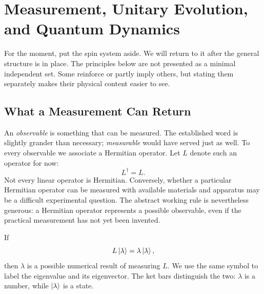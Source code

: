 \chapter{Measurement, Unitary Evolution, and Quantum Dynamics}


For the moment, put the spin system aside. We will return to it after the general structure is in place. The principles below are not presented as a minimal independent set. Some reinforce or partly imply others, but stating them separately makes their physical content easier to see.

\section{What a Measurement Can Return}

An \emph{observable} is something that can be measured. The established word is slightly grander than necessary; \emph{measurable} would have served just as well. To every observable we associate a Hermitian operator. Let \(L\) denote such an operator for now:
\begin{equation}
L^\dagger=L.
\end{equation}
Not every linear operator is Hermitian. Conversely, whether a particular Hermitian operator can be measured with available materials and apparatus may be a difficult experimental question. The abstract working rule is nevertheless generous: a Hermitian operator represents a possible observable, even if the practical measurement has not yet been invented.

If
\begin{equation}
L\left\lvert\lambda\right\rangle=\lambda\left\lvert\lambda\right\rangle,
\end{equation}
then \(\lambda\) is a possible numerical result of measuring \(L\). We use the same symbol to label the eigenvalue and its eigenvector. The ket bars distinguish the two: \(\lambda\) is a number, while \(\left\lvert\lambda\right\rangle\) is a state.

